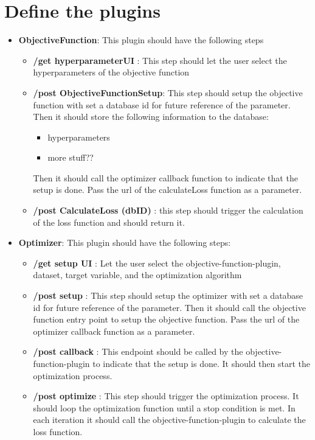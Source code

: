 \documentclass[
  a4paper,  %
  twoside,  %
  bibliography=totoc,
  headsepline,
  cleardoublepage=empty,
  parskip=half,
  draft=false
]{scrbook}
\begin{document}
\chapter{Define the plugins}
\begin{itemize}
  \item \textbf{ObjectiveFunction}: This plugin should have the following steps
  \begin{itemize}
    \item \textbf{ /get hyperparameterUI }: This step should let the user select the hyperparameters of the objective function
    \item \textbf{ /post ObjectiveFunctionSetup}: This step should setup the objective function with set a database id for future reference of the parameter.
    Then it should store the following information to the database:
    \begin{itemize}
      \item hyperparameters
      \item more stuff?? %
    \end{itemize}
    Then it should call the optimizer callback function to indicate that the setup is done. Pass the url of the calculateLoss function as a parameter.
    \item \textbf{ /post CalculateLoss (dbID) }: this step should trigger the calculation of the loss function and should return it.
  \end{itemize}
  \item \textbf{Optimizer}: This plugin should have the following steps:
    \begin{itemize}
      \item \textbf{ /get setup UI }: Let the user select the objective-function-plugin, dataset, target variable, and the optimization algorithm
      \item \textbf{ /post setup }: This step should setup the optimizer with set a database id for future reference of the parameter.
      Then it should call the objective function entry point to setup the objective function. Pass the url of the optimizer callback function as a parameter.
      \item \textbf{ /post callback }: This endpoint should be called by the objective-function-plugin to indicate that the setup is done.
      It should then start the optimization process.
      \item \textbf{ /post optimize }: This step should trigger the optimization process.
      It should loop the optimization function until a stop condition is met.
      In each iteration it should call the objective-function-plugin to calculate the loss function.
    \end{itemize}
\end{itemize}
\end{document}
